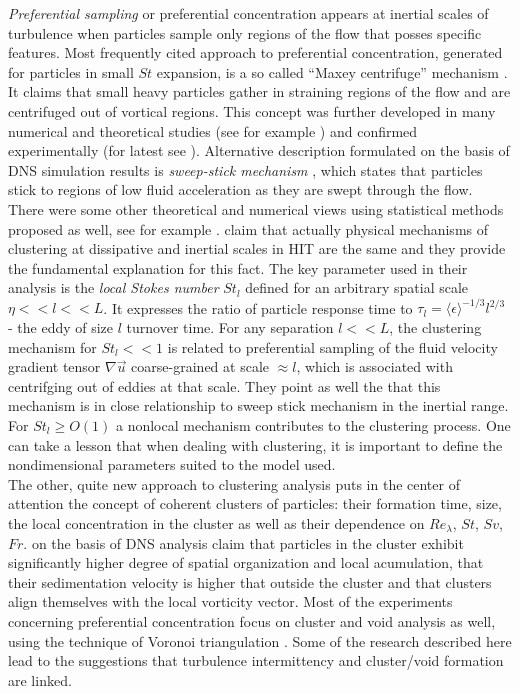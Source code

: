 \documentclass[../main.tex]{subfiles}
\begin{document}
 \emph{Preferential sampling} or preferential concentration appears at inertial scales of turbulence when particles sample only regions of the flow that posses specific features.  Most frequently cited approach to preferential concentration, generated for particles in small $St$ expansion, is a so called “Maxey centrifuge” mechanism \citep{Maxey1987}. It claims that small heavy particles gather in straining regions of the flow and are centrifuged out of vortical regions. This  concept was further developed in many numerical and theoretical studies (see for example \citet{Sigurgeirsson2002,Cencini2006}) and confirmed experimentally (for latest see \citet{Bhatnagar2018}). Alternative description formulated on the basis of DNS simulation results is \emph{sweep-stick mechanism} \citep{Goto2008,Coleman2009}, which states that particles stick to regions of low fluid acceleration as they are swept through the flow. There were some other theoretical and numerical views using statistical methods proposed as well, see for example \citet{Falkovich2002, Bec2007, Hartlep2017}. \citet{Bragg2015a} claim that actually physical mechanisms of clustering at dissipative and inertial scales in HIT are the same and they provide the fundamental explanation for this fact. The key parameter used in their analysis is the \emph{local Stokes number} $St_l$ defined for an arbitrary spatial scale $ \eta << l << L$. It expresses the ratio of particle response time to $\tau_l= \langle \epsilon\rangle^{-1/3} l^{2/3}$ - the eddy of size $l$ turnover time. For any separation $l<<L$, the clustering mechanism for $St_l<<1$ is related to preferential sampling of the fluid velocity gradient tensor $\nabla \vec{u}$ coarse-grained at scale $\approx l$, which is associated with centrifging out of eddies at that scale. They point as well the that this mechanism is in close relationship to sweep stick mechanism in the inertial range. For $St_l \geq O(1)$ a nonlocal mechanism contributes to the clustering process. One can take a lesson that when dealing with clustering, it is important to define the nondimensional parameters suited to the model used.\\
The other, quite new approach to clustering analysis puts in the center of attention the concept of coherent clusters of particles: their formation time, size, the local concentration in the cluster as well as their dependence on $Re_{\lambda}$, $St$, $Sv$, $Fr$. \citet{Baker2017, Momenifar2019} on the basis of DNS analysis claim that particles in the cluster exhibit significantly higher degree of spatial organization and local acumulation, that their sedimentation velocity is higher that outside the cluster and that clusters align themselves with the local vorticity vector. Most of the  experiments concerning preferential concentration focus on cluster and void analysis as well, using the technique of Voronoi triangulation \citep{Monchaux2010,Monchaux2012, Obligado2014, Sumbekova2017, Manish2018}. Some of the research described here lead to the suggestions that turbulence intermittency and cluster/void formation are linked.\\
\end{document}
